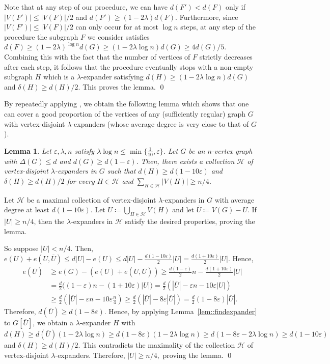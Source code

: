 \documentclass[10pt]{article}
\theoremstyle{plain}
\numberwithin{theorem}{section}
\newtheorem{lemma}[theorem]{Lemma}
\theoremstyle{definition}
\theoremstyle{remark}
\renewenvironment{proof}[1][]{\begin{trivlist}
\item[\hspace{\labelsep}{\bf\noindent Proof#1.\/}] }{\qed\end{trivlist}}
\newcommand{\cH}{\mathcal{H}}
\renewcommand{\setminus}{-}
\newcommand{\eps}{\varepsilon}
\theoremstyle{plain}
\begin{document}
\begin{proof}
	Note that at any step of our procedure, we can have $d(F') < d(F)$ only if $|V(F')| \le |V(F)|/2$ and $d(F') \geq (1-2\lambda)d(F)$. Furthermore, since $|V(F')| \le |V(F)|/2$ can only occur for at most $\log n$ steps, at any step of the procedure the subgraph $F$ we consider satisfies $d(F) \geq (1-2\lambda)^{\log n} d(G) \ge (1 - 2 \lambda \log n)d(G) \ge 4d(G)/5$. Combining this with the fact that the number of vertices of $F$ strictly decreases after each step, it follows that the procedure eventually stops with a non-empty subgraph $H$ which is a $\lambda$-expander satisfying $d(H) \ge (1 - 2 \lambda \log n)d(G)$ and $\delta(H) \ge d(H)/2$. This proves the lemma.
\end{proof}

By repeatedly applying , we obtain the following lemma which shows that one can cover a good proportion of the vertices of any (sufficiently regular) graph $G$ with vertex-disjoint $\lambda$-expanders (whose average degree is very close to that of $G$). 

\begin{lemma}
	\label{lem:packingoneround}
	Let $\eps, \lambda, n$ satisfy $\lambda \log n \le \min \{\frac{1}{10}, \eps \}$. Let $G$ be an $n$-vertex graph with $\Delta(G) \le d$ and $d(G) \ge d(1- \eps)$. Then, there exists a collection $\cH$ of vertex-disjoint $\lambda$-expanders in $G$ such that $d(H) \ge d(1-10 \eps)$ and $\delta(H) \ge d(H)/2$ for every $H \in \cH$ and $\sum_{H \in \cH} |V(H)| \ge n/4$.
\end{lemma}
\begin{proof}
	Let $\cH$ be a maximal collection of vertex-disjoint $\lambda$-expanders in $G$ with average degree at least $d(1-10 \eps)$. Let $U \coloneqq \bigcup_{H \in \cH} V(H)$ and let $\overline{U} \coloneqq V(G) \setminus U$. If $|U| \ge n/4$, then the $\lambda$-expanders in $\cH$ satisfy the desired properties, proving the lemma. 

	So suppose $|U| < n/4$. Then, $e(U) + e(U, \overline{U}) \le d|U| - e(U) \le d|U| - \frac{d(1-10\eps)}{2} |U| = \frac{d(1+10\eps)}{2} |U|$. Hence, 
	\begin{align*}
		e(\overline{U}) 
		& \ge e(G) - \left(e(U) + e(U, \overline{U})\right) 
		\ge \frac{d(1-\eps)}{2}n - \frac{d(1+10\eps)}{2} |U| \\
		& = \frac{d}{2} \big((1-\eps)n - (1+10\eps)|U|\big) 
		= \frac{d}{2} \left(|\overline{U}| - \eps n - 10 \eps |U|\right) \\
		& \ge \frac{d}{2} \left(|\overline{U}| - \eps n - 10 \eps \frac{n}{4}\right) 
		\ge \frac{d}{2} \left(|\overline{U}| - 8 \eps |\overline{U}|\right) 
		= \frac{d}{2}(1-8 \eps)|\overline{U}|.
	\end{align*}
	Therefore, $d(\overline{U}) \ge d (1 - 8 \eps).$ Hence, by applying Lemma~\ref{lem::findexpander} to $G[\overline{U}]$, we obtain a $\lambda$-expander $H$ with $d(H) \ge d(\overline{U})(1 - 2 \lambda \log n) \ge d (1 - 8 \eps) (1 - 2 \lambda \log n) \ge d (1 - 8 \eps -2 \lambda \log n) \ge d (1 - 10 \eps)$ and $\delta(H) \ge d(H)/2$. This contradicts the maximality of the collection $\cH$ of vertex-disjoint $\lambda$-expanders. Therefore, $|U| \ge n/4,$ proving the lemma.
\end{proof}
\end{document}
